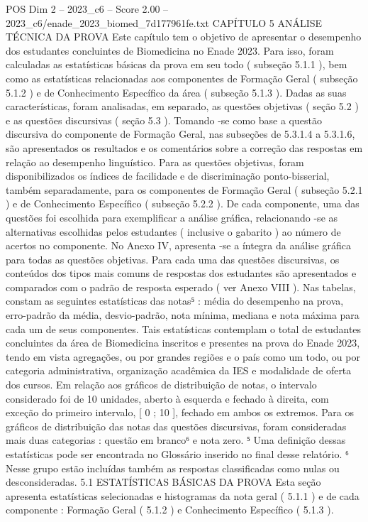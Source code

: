 \begin{textsample}{POS Dim 2 – 2023\_c6 – Score 2.00 – 2023\_c6/enade\_2023\_biomed\_7d177961fe.txt}  \label{ex:f2_pos_169}
CAPÍTULO 5 ANÁLISE TÉCNICA DA PROVA Este capítulo tem o objetivo de apresentar o desempenho dos estudantes concluintes de Biomedicina no Enade 2023.
Para isso, foram calculadas as estatísticas básicas da prova em seu todo ( subseção 5.1.1 ), bem como as estatísticas relacionadas aos componentes de Formação Geral ( subseção 5.1.2 ) e de Conhecimento Específico da área ( subseção 5.1.3 ).
Dadas as suas características, foram analisadas, em separado, as questões objetivas ( seção 5.2 ) e as questões discursivas ( seção 5.3 ).
Tomando -se como base a questão discursiva do componente de Formação Geral, nas subseções de 5.3.1.4 a 5.3.1.6, são apresentados os resultados e os comentários sobre a correção das respostas em relação ao desempenho linguístico.
Para as questões objetivas, foram disponibilizados os índices de facilidade e de discriminação ponto-bisserial, também separadamente, para os componentes de Formação Geral ( subseção 5.2.1 ) e de Conhecimento Específico ( subseção 5.2.2 ).
De cada componente, uma das questões foi escolhida para exemplificar a análise gráfica, relacionando -se as alternativas escolhidas pelos estudantes ( inclusive o gabarito ) ao número de acertos no componente.
No Anexo IV, apresenta -se a íntegra da análise gráfica para todas as questões objetivas.
Para cada uma das questões discursivas, os conteúdos dos tipos mais comuns de respostas dos estudantes são apresentados e comparados com o padrão de resposta esperado ( ver Anexo VIII ).
Nas tabelas, constam as seguintes estatísticas das notas⁵ : média do desempenho na prova, erro-padrão da média, desvio-padrão, nota mínima, mediana e nota máxima para cada um de seus componentes.
Tais estatísticas contemplam o total de estudantes concluintes da área de Biomedicina inscritos e presentes na prova do Enade 2023, tendo em vista agregações, ou por grandes regiões e o país como um todo, ou por categoria administrativa, organização acadêmica da IES e modalidade de oferta dos cursos.
Em relação aos gráficos de distribuição de notas, o intervalo considerado foi de 10 unidades, aberto à esquerda e fechado à direita, com exceção do primeiro intervalo, [ 0 ; 10 ], fechado em ambos os extremos.
Para os gráficos de distribuição das notas das questões discursivas, foram consideradas mais duas categorias : questão em branco⁶ e nota zero. ⁵ Uma definição dessas estatísticas pode ser encontrada no Glossário inserido no final desse relatório. ⁶ Nesse grupo estão incluídas também as respostas classificadas como nulas ou desconsideradas. 5.1 ESTATÍSTICAS BÁSICAS DA PROVA Esta seção apresenta estatísticas selecionadas e histogramas da nota geral ( 5.1.1 ) e de cada componente : Formação Geral ( 5.1.2 ) e Conhecimento Específico ( 5.1.3 ).

\end{textsample}
